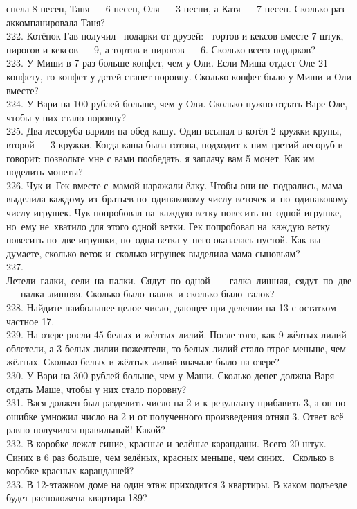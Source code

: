 спела 8 песен, Таня --- 6 песен, Оля --- 3 песни, а Катя --- 7 песен. Сколько раз аккомпанировала Таня?\\
222. Котёнок Гав получил  подарки от друзей:  тортов и кексов вместе 7 штук, пирогов и кексов --- 9, а тортов и пирогов --- 6. Сколько всего подарков?\\
223. У Миши в 7 раз больше конфет, чем у Оли. Если Миша отдаст Оле 21 конфету, то конфет у детей станет поровну. Сколько конфет было у Миши и Оли вместе?\\
224. У Вари на 100 рублей больше, чем у Оли. Сколько нужно отдать Варе Оле, чтобы у них стало поровну?\\
225. Два лесоруба варили на обед кашу. Один всыпал в котёл 2 кружки крупы, второй --- 3 кружки. Когда каша была готова, подходит к ним третий лесоруб и говорит: позвольте мне с вами пообедать, я заплачу вам 5 монет. Как им поделить монеты?\\
226. Чук и Гек вместе с мамой наряжали ёлку. Чтобы они не подрались, мама выделила каждому из братьев по одинаковому числу веточек и по одинаковому числу игрушек. Чук попробовал на каждую ветку повесить по одной игрушке, но ему не хватило для этого одной ветки. Гек попробовал на каждую ветку повесить по две игрушки, но одна ветка у него оказалась пустой. Как вы думаете, сколько веток и сколько игрушек выделила мама сыновьям?\\
227. Летели галки, сели на палки. Сядут по одной --- галка лишняя, сядут по две --- палка лишняя. Сколько было палок и сколько было галок?\\
228. Найдите наибольшее целое число, дающее при делении на 13 с остатком частное 17.\\
229. На озере росли 45 белых и жёлтых лилий. После того, как 9 жёлтых лилий облетели, а 3 белых лилии пожелтели, то белых лилий стало втрое меньше, чем жёлтых. Сколько белых и жёлтых лилий вначале было на озере?\\
230. У Вари на 300 рублей больше, чем у Маши. Сколько денег должна Варя отдать Маше, чтобы у них стало поровну?\\
231. Вася должен был разделить число на 2 и к результату прибавить 3, а он по ошибке умножил число на 2 и от полученного произведения отнял 3. Ответ всё равно получился правильный! Какой?\\
232. В коробке лежат синие, красные и зелёные карандаши. Всего 20 штук. Синих в 6 раз больше, чем зелёных, красных меньше, чем синих. 
Сколько в коробке красных карандашей?\\
233. В 12-этажном доме на один этаж  приходится 3 квартиры. В каком подъезде будет расположена квартира 189?\\

